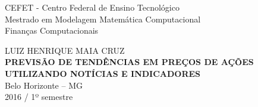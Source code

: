 \begin{titlepage}
\begin{center}
CEFET - Centro Federal de Ensino Tecnológico \\
Mestrado em Modelagem Matemática Computacional \\
Finanças Computacionais \\
\end{center}
\vspace{5em}
\begin{center}
{LUIZ HENRIQUE MAIA CRUZ}\\ 
\vspace{10em}
\textbf{PREVISÃO DE TENDÊNCIAS EM PREÇOS DE AÇÕES UTILIZANDO NOTÍCIAS E INDICADORES} \\
\hspace{.45\textwidth} %
\vfill
Belo Horizonte -- MG \\
2016 / 1º semestre
\end{center}
\end{titlepage}
